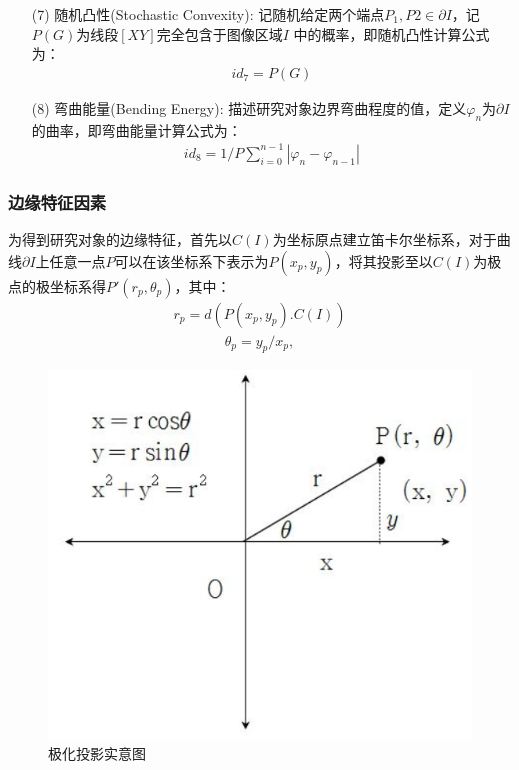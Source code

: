 \documentclass{whutmod}
\begin{document}
\begin{itemize}
		\item[(7)]随机凸性(Stochastic Convexity):
		记随机给定两个端点$P_{1},P{2}\in\partial I$，记$P(G)$为线段$[XY]$完全包含于图像区域$I$ 中的概率，即随机凸性计算公式为：
		\begin{gather}
		id_{7}=P(G)
		\end{gather}
		
		\item[(8)]弯曲能量(Bending Energy):
		描述研究对象边界弯曲程度的值，定义$\varphi _{n}$为$\partial I$的曲率，即弯曲能量计算公式为：
		\begin{gather}	
		id_{8}= 1 / P \sum _ { i = 0 } ^ { n - 1 } \left|\varphi _{n} -\varphi _{n-1}\right|
		\end{gather}
		

		\end{itemize}	

	

		\subsubsection{边缘特征因素}
		为得到研究对象的边缘特征，首先以$C(I)$为坐标原点建立笛卡尔坐标系，对于曲线$\partial I$上任意一点$P$可以在该坐标系下表示为$P(x_{p},y_{p})$，将其投影至以$C(I)$为极点的极坐标系得${P}'(r_{p},\theta _{p})$，其中：
		\begin{gather}
		r_{p}=d(P(x_{p},y_{p}).C(I))
		\end{gather}
		\begin{gather}
		\theta _{p}=y_{p}/x_{p},
		\end{gather}

	  \begin{figure}[H]
		\centering
		\includegraphics[width=.6\textwidth]{figures/jihua.png}
			\centering 		\caption{极化投影实意图}\label{66}
	\end{figure}
		
\end{document}
